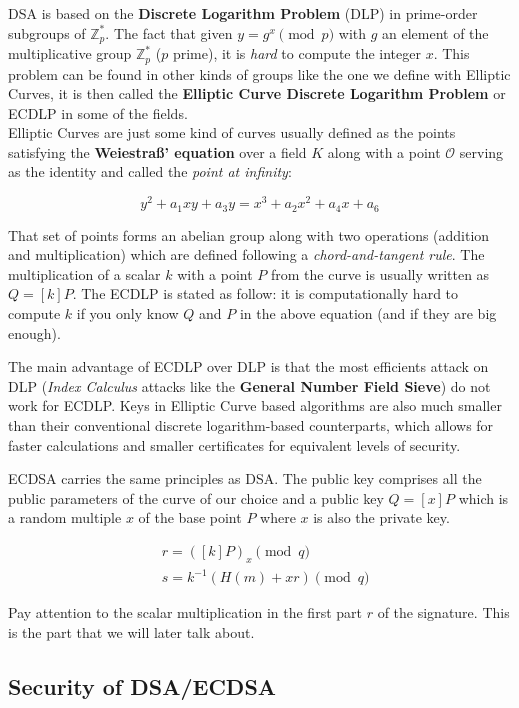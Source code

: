 \documentclass[a4paper,11pt]{article}
\begin{document}
DSA is based on the \textbf{Discrete Logarithm Problem} (DLP) in prime-order subgroups of $\mathbb{Z}^{\ast}_p$. The fact that given $y = g^x \pmod{p}$ with $g$ an element of the multiplicative group $\mathbb{Z}_{p}^{\ast}$ ($p$ prime), it is \emph{hard} to compute the integer $x$. This problem can be found in other kinds of groups like the one we define with Elliptic Curves, it is then called the \textbf{Elliptic Curve Discrete Logarithm Problem} or ECDLP in some of the fields.\\

Elliptic Curves are just some kind of curves usually defined as the points satisfying the \textbf{Weiestraß' equation} over a field $K$ along with a point $\mathcal{O}$ serving as the identity and called the \textit{point at infinity}:

$$ y^2 + a_1xy + a_3y = x^3 + a_2x^2 + a_4x + a_6 $$

That set of points forms an abelian group along with two operations (addition and multiplication) which are defined following a \textit{chord-and-tangent rule}. The multiplication of a scalar $k$ with a point $P$ from the curve is usually written as $Q = [k]P$. The ECDLP is stated as follow: it is computationally hard to compute $k$ if you only know $Q$ and $P$ in the above equation (and if they are big enough).

The main advantage of ECDLP over DLP is that the most efficients attack on DLP (\textit{Index Calculus} attacks like the \textbf{General Number Field Sieve}) do not work for ECDLP. Keys in Elliptic Curve based algorithms are also much smaller than their conventional discrete logarithm-based counterparts, which allows for faster calculations and smaller certificates for equivalent levels of security. 

ECDSA carries the same principles as DSA. The public key comprises all the public parameters of the curve of our choice and a public key $Q = [x]P$ which is a random multiple $x$ of the base point $P$  where $x$ is also the private key.

\begin{align*}
&r = ([k]P)_x \pmod{q}\\
&s = k^{-1} ( H(m) + x r ) \pmod{q}
\end{align*}

Pay attention to the scalar multiplication in the first part $r$ of the signature. This is the part that we will later talk about.

\subsection{Security of DSA/ECDSA}\label{security_dsa_ecdsa}
\end{document}
